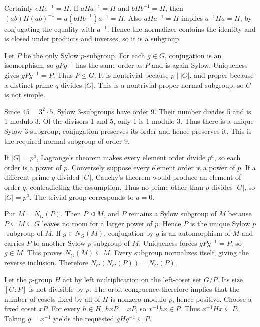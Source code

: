 Certainly $eHe^{-1}=H$. If $aHa^{-1}=H$ and $bHb^{-1}=H$, then
$(ab)H(ab)^{-1}=a(bHb^{-1})a^{-1}=H$.
Also $aHa^{-1}=H$ implies $a^{-1}Ha=H$, by conjugating the equality with $a^{-1}$. Hence the normalizer contains the identity and is closed under products and inverses, so it is a subgroup.

Let $P$ be the only Sylow $p$-subgroup. For each $g\in G$, conjugation is an isomorphism, so $gPg^{-1}$ has the same order as $P$ and is again Sylow. Uniqueness gives $gPg^{-1}=P$.
Thus $P\trianglelefteq G$. It is nontrivial because $p\mid|G|$, and proper because a distinct prime $q$ divides $|G|$. This is a nontrivial proper normal subgroup, so $G$ is not simple.

Since $45=3^2\cdot5$, Sylow 3-subgroups have order 9. Their number divides 5 and is 1 modulo 3. Of the divisors 1 and 5, only 1 is 1 modulo 3. Thus there is a unique Sylow 3-subgroup; conjugation preserves its order and hence preserves it. This is the required normal subgroup of order 9.

If $|G|=p^a$, Lagrange's theorem makes every element order divide $p^a$, so each order is a power of $p$.
Conversely suppose every element order is a power of $p$. If a different prime $q$ divided $|G|$, Cauchy's theorem would produce an element of order $q$, contradicting the assumption. Thus no prime other than $p$ divides $|G|$, so $|G|=p^a$. The trivial group corresponds to $a=0$.

Put $M=N_G(P)$. Then $P\trianglelefteq M$, and $P$ remains a Sylow subgroup of $M$ because $P\subseteq M\subseteq G$ leaves no room for a larger power of $p$. Hence $P$ is the unique Sylow $p$-subgroup of $M$.
If $g\in N_G(M)$, conjugation by $g$ is an automorphism of $M$ and carries $P$ to another Sylow $p$-subgroup of $M$. Uniqueness forces $gPg^{-1}=P$, so $g\in M$.
This proves $N_G(M)\subseteq M$. Every subgroup normalizes itself, giving the reverse inclusion. Therefore $N_G(N_G(P))=N_G(P)$.

Let the $p$-group $H$ act by left multiplication on the left-coset set $G/P$. Its size $[G:P]$ is not divisible by $p$. The orbit congruence therefore implies that the number of cosets fixed by all of $H$ is nonzero modulo $p$, hence positive.
Choose a fixed coset $xP$. For every $h\in H$, $hxP=xP$, so $x^{-1}hx\in P$. Thus $x^{-1}Hx\subseteq P$.
Taking $g=x^{-1}$ yields the requested $gHg^{-1}\subseteq P$.

